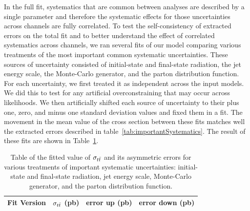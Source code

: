 In the full fit, systematics that are common between analyses are described by a single parameter and therefore the systematic effects for those uncertainties across channels are fully correlated.
To test the self-consistency of extracted errors on the total fit and to better understand the effect of correlated systematics across channels, 
we ran several fits of our model comparing various treatments of the most important common systematic uncertainties.
These sources of uncertainty consisted of initial-state and final-state radiation, the jet energy scale, the Monte-Carlo generator, and the parton distribution function.
For each uncertainty, we first treated it as independent across the input models.  
We did this to test for any artificial overconstraining that may occur across likelihoods.
We then artificially shifted each source of uncertainty to their plus one, zero, and minus one standard deviation values and fixed them in a fit. 
The movement in the mean value of the cross section between these fits matches well the extracted errors described in table~\ref{tab:importantSystematics}.
The result of these fits are shown in Table~\ref{tab:SystematicDecorrelation}. 

\begin{table}[htbp]

  \begin{center}
    \begin{tabular}{|c|ccc|}
      \hline
      Fit Version & $\sigma_{t\bar{t}}$ (pb) & error up (pb) & error down (pb)  \\
      \hline
      \hline
      
      \hline
    \end{tabular}
  \end{center}
  \caption{ \label{tab:SystematicDecorrelation} Table of the fitted value of $\sigma_{ t\bar{t} }$ and its asymmetric errors for various treatments of important systematic uncertainties: initial-state and final-state radiation, jet energy scale, Monte-Carlo generator, and the parton distribution function.   }
\end{table}






